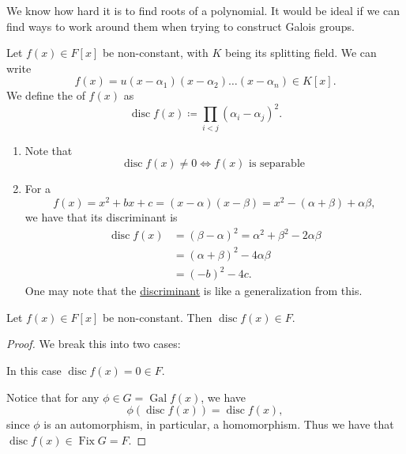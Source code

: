 \documentclass[notoc,notitlepage,nobib]{tufte-book}
\DeclareMathOperator{\disc}{disc}
\DeclareMathOperator{\Gal}{Gal}
\DeclareMathOperator{\Fix}{Fix}
\begin{document}
We know how hard it is to find roots of a polynomial. It would be ideal if we
can find ways to work around them when trying to construct Galois groups.

\begin{defn}[Discriminant]\label{defn:discriminant}
  Let $f(x) \in F[x]$ be non-constant, with $K$ being its splitting field. We
  can write
  \begin{equation*}
    f(x) = u(x - \alpha_1)(x - \alpha_2) \hdots (x - \alpha_n) \in K[x].
  \end{equation*}
  We define the  of $f(x)$ as
  \begin{equation*}
    \disc f(x) \coloneqq \prod_{i < j} (\alpha_i - \alpha_j)^2.
  \end{equation*}
\end{defn}

\begin{remark}
  \begin{enumerate}
    \item Note that
      \begin{equation*}
        \disc f(x) \neq 0 \iff f(x) \text{ is separable }
      \end{equation*}
    \item For a 
      \begin{equation*}
        f(x) = x^2 + bx + c = (x - \alpha)(x - \beta) = x^2 - (\alpha + \beta) +
        \alpha\beta,
      \end{equation*}
      we have that its discriminant is
      \begin{align*}
        \disc f(x) &= (\beta - \alpha)^2 = \alpha^2 + \beta^2 - 2 \alpha\beta \\
                   &= (\alpha + \beta)^2 - 4 \alpha \beta \\
                   &= (-b)^2 - 4c.
      \end{align*}
      One may note that the \hyperref[defn:discriminant]{discriminant} is like a
      generalization from this.
  \end{enumerate}
\end{remark}

\begin{lemma}\label{lemma:the_discriminant_lives_in_the_base_field}
  Let $f(x) \in F[x]$ be non-constant. Then $\disc f(x) \in F$.
\end{lemma}

\begin{proof}
  We break this into two cases:

  \noindent
   In this case $\disc f(x) = 0 \in F$.

  \noindent
   Notice that for any $\phi \in G = \Gal f(x)$,
  we have
  \begin{equation*}
    \phi(\disc f(x)) = \disc f(x),
  \end{equation*}
  since $\phi$ is an automorphism, in particular, a homomorphism. Thus we have
  that $\disc f(x) \in \Fix G = F$.
\end{proof}
\end{document}
